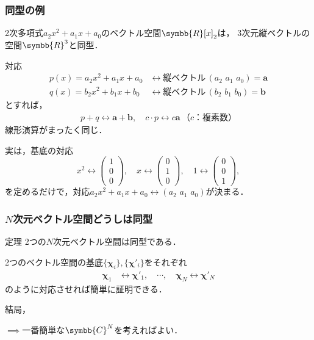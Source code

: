 \documentclass[
    10pt,
    ]{sotsu-beamer}
\begin{document}
\begin{frame}[allowframebreaks]
    \frametitle{同型の例}

    2次多項式$a_2 x^2 + a_1 x + a_0$のベクトル空間$\symbb{R}[x]_2$は，
    3次元縦ベクトルの空間$\symbb{R}^3$と同型．

    対応
    \begin{align*}
        p(x) = a_2 x^2 + a_1 x + a_0
        &\leftrightarrow \text{縦ベクトル} \, (a_2 \,\, a_1 \,\, a_0) = \symbf{a}
        \\
        q(x) = b_2 x^2 + b_1 x + b_0
        &\leftrightarrow \text{縦ベクトル} \, (b_2 \,\, b_1 \,\, b_0) = \symbf{b}
    \end{align*}
    とすれば，
    \begin{align*}
        p + q \leftrightarrow \symbf{a} + \symbf{b},
        \quad
        c \cdotp p \leftrightarrow c \symbf{a} \, \text{（$c$：複素数）}
    \end{align*}
    線形演算がまったく同じ．


    \framebreak

    実は，基底の対応
    \begin{equation*}
        x^2 \leftrightarrow \begin{pmatrix} 1 \\ 0 \\ 0 \end{pmatrix},
        \quad 
        x \leftrightarrow \begin{pmatrix} 0 \\ 1 \\ 0 \end{pmatrix},
        \quad 
        1 \leftrightarrow \begin{pmatrix} 0 \\ 0 \\ 1 \end{pmatrix},
    \end{equation*}
    を定めるだけで，対応$a_2 x^2 + a_1 x + a_0 \leftrightarrow (a_2 \,\, a_1 \,\, a_0)$が決まる．

\end{frame}


\begin{frame}
    \frametitle{$N$次元ベクトル空間どうしは同型}

    \begin{block}{定理}
        2つの$N$次元ベクトル空間は同型である．
    \end{block}

    2つのベクトル空間の基底$\{\symbf{\chi}_i\}, \{\symbf{\chi}'_i\}$をそれぞれ
    \begin{align*}
        \symbf{\chi}_1 &\leftrightarrow \symbf{\chi}'_1, 
        \quad
        \cdots, 
        \quad
        \symbf{\chi}_N \leftrightarrow \symbf{\chi}'_N
    \end{align*}
    のように対応させれば簡単に証明できる．

    \pause 

    結局，

    $\implies$一番簡単な$\symbb{C}^N$を考えればよい．

\end{frame}
\end{document}
